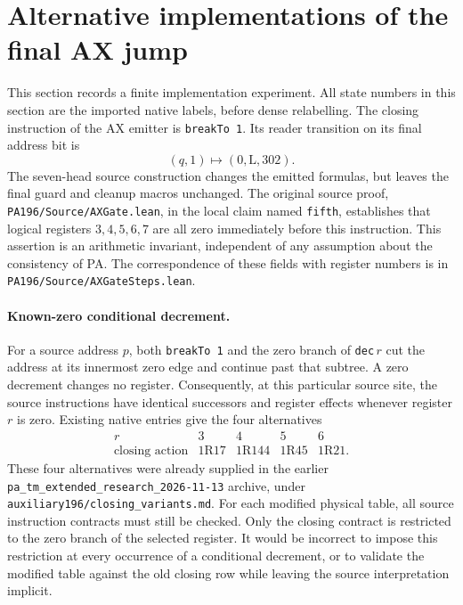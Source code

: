 \section{Alternative implementations of the final AX jump}
\label{sec:closing-alternatives}

This section records a finite implementation experiment.  All state numbers
in this section are the imported native labels, before dense relabelling.
The closing instruction of the AX emitter is \texttt{breakTo 1}.  Its reader
transition on its final address bit is
\[
       (q,1)\longmapsto (0,\mathrm L,302).
\]
The seven-head source construction changes the emitted formulas, but leaves
the final guard and cleanup macros unchanged.  The original source proof,
\texttt{PA196/Source/AXGate.lean}, in the local claim named
\texttt{fifth}, establishes that logical registers $3,4,5,6,7$ are all zero
immediately before this instruction.  This assertion is an arithmetic
invariant, independent of any assumption about the consistency of PA.
The correspondence of these fields with register numbers is in
\texttt{PA196/Source/AXGateSteps.lean}.

\paragraph{Known-zero conditional decrement.}
For a source address $p$, both \texttt{breakTo 1} and the zero branch of
\texttt{dec}$\,r$ cut the address at its innermost zero edge and continue
past that subtree.  A zero decrement changes no register.  Consequently,
at this particular source site, the source instructions have identical
successors and register effects whenever register $r$ is zero.  Existing
native entries give the four alternatives
\[
\begin{array}{c|cccc}
r&3&4&5&6\\ \hline
\text{closing action}&1\mathrm R17&1\mathrm R144&
  1\mathrm R45&1\mathrm R21 .
\end{array}
\]
These four alternatives were already supplied in the earlier
\texttt{pa\_tm\_extended\_research\_2026-11-13} archive, under
\texttt{auxiliary196/closing\_variants.md}.
For each modified physical table, all source instruction contracts must
still be checked.  Only the closing contract is restricted to the zero
branch of the selected register.  It would be incorrect to impose this
restriction at every occurrence of a conditional decrement, or to validate
the modified table against the old closing row while leaving the source
interpretation implicit.

